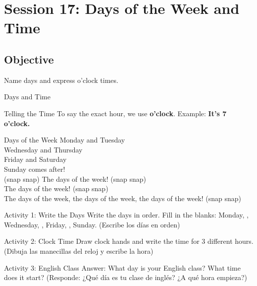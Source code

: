\section*{Session 17: Days of the Week and Time}

\subsection*{Objective}
Name days and express o'clock times.

\begin{vocabcard}{Days and Time}
\end{vocabcard}

\begin{grammartip}{Telling the Time}
  To say the exact hour, we use \textbf{o'clock}. Example: \textbf{It's 7 o'clock.}
\end{grammartip}

\begin{songbox}{Days of the Week}
  Monday and Tuesday \\
  Wednesday and Thursday \\
  Friday and Saturday \\
  Sunday comes after! \\
  (snap snap) The days of the week! (snap snap) \\
  The days of the week! (snap snap) \\
  The days of the week, the days of the week, the days of the week! (snap snap)
\end{songbox}

\begin{activity}{Activity 1: Write the Days}
  Write the days in order. Fill in the blanks: Monday, \answerline[2cm], Wednesday, \answerline[2cm], Friday, \answerline[2cm], Sunday. (Escribe los días en orden)
\end{activity}

\begin{activity}{Activity 2: Clock Time}
  Draw clock hands and write the time for 3 different hours. (Dibuja las manecillas del reloj y escribe la hora)
  \writinglines[3]
\end{activity}

\begin{activity}{Activity 3: English Class}
  Answer: What day is your English class? What time does it start? (Responde: ¿Qué día es tu clase de inglés? ¿A qué hora empieza?)
  \writinglines[2]
\end{activity}

